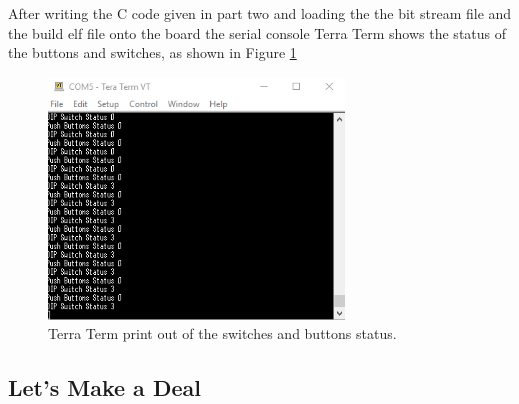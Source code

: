 After writing the C code given in part two and loading the the bit stream file and the build elf file onto the board the serial console Terra Term shows the status of the buttons and switches, as shown in Figure \ref{fig: Vivado_lab4_TT_PartII}
\begin{figure}[H]
	\centering
	\includegraphics[width=0.7\textwidth]{01_images/Vivado_lab4_TT_PartII.PNG}
	\caption{Terra Term print out of the switches and buttons status.}
	\label{fig: Vivado_lab4_TT_PartII}
\end{figure}

\subsection{Let's Make a Deal}\label{subsec: Lets Make a Deal}


